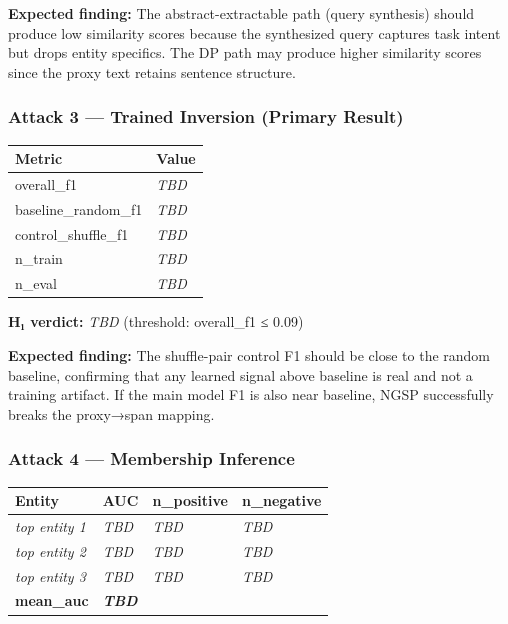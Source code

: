 \textbf{Expected finding:} The abstract-extractable path (query
synthesis) should produce low similarity scores because the synthesized
query captures task intent but drops entity specifics. The DP path may
produce higher similarity scores since the proxy text retains sentence
structure.

\subsubsection{Attack 3 --- Trained Inversion (Primary
Result)}\label{attack-3-trained-inversion-primary-result}

{\def\LTcaptype{none} %
\begin{longtable}[]{@{}ll@{}}
\toprule\noalign{}
Metric & Value \\
\midrule\noalign{}
\endhead
\bottomrule\noalign{}
\endlastfoot
overall\_f1 & \emph{TBD} \\
baseline\_random\_f1 & \emph{TBD} \\
control\_shuffle\_f1 & \emph{TBD} \\
n\_train & \emph{TBD} \\
n\_eval & \emph{TBD} \\
\end{longtable}
}

\textbf{H₁ verdict:} \emph{TBD} (threshold: overall\_f1 ≤ 0.09)

\textbf{Expected finding:} The shuffle-pair control F1 should be close
to the random baseline, confirming that any learned signal above
baseline is real and not a training artifact. If the main model F1 is
also near baseline, NGSP successfully breaks the proxy→span mapping.

\subsubsection{Attack 4 --- Membership
Inference}\label{attack-4-membership-inference}

{\def\LTcaptype{none} %
\begin{longtable}[]{@{}llll@{}}
\toprule\noalign{}
Entity & AUC & n\_positive & n\_negative \\
\midrule\noalign{}
\endhead
\bottomrule\noalign{}
\endlastfoot
\emph{top entity 1} & \emph{TBD} & \emph{TBD} & \emph{TBD} \\
\emph{top entity 2} & \emph{TBD} & \emph{TBD} & \emph{TBD} \\
\emph{top entity 3} & \emph{TBD} & \emph{TBD} & \emph{TBD} \\
\textbf{mean\_auc} & \textbf{\emph{TBD}} & & \\
\end{longtable}
}

